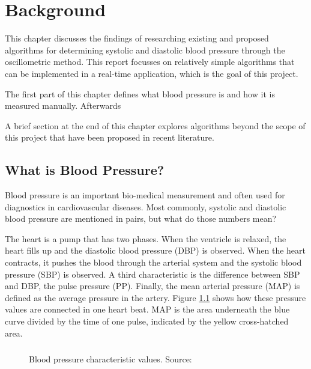 \chapter{Background}\label{cp:theory} %
This chapter discusses the findings of researching existing and proposed algorithms for determining systolic and diastolic blood pressure through the oscillometric method. This report focusses on relatively simple algorithms that can be implemented in a real-time application, which is the goal of this project.

The first part of this chapter defines what blood pressure is and how it is measured manually. Afterwards

A brief section at the end of this chapter explores algorithms beyond the scope of this project that have been proposed in recent literature.

\section{What is Blood Pressure?}
Blood pressure is an important bio-medical measurement and often used for  diagnostics in cardiovascular diseases. Most commonly, systolic and diastolic blood pressure are mentioned in pairs, but what do those numbers mean?

The heart is a pump that has two phases. When the ventricle is relaxed, the heart fills up and the diastolic blood pressure (DBP) is observed. When the heart contracts, it pushes the blood through the arterial system and the systolic blood pressure (SBP) is observed. A third characteristic is the difference between SBP and DBP, the pulse pressure (PP). Finally, the mean arterial pressure (MAP) is defined as the average pressure in the artery. Figure \ref{fig:BP} shows how these pressure values are connected in one heart beat. MAP is the area underneath the blue curve divided by the time of one pulse, indicated by the yellow cross-hatched area. \cite{Boron2012}\paragraph{}

\begin{figure}[]
\centering
\caption{Blood pressure characteristic values. Source: \cite{Boron2012}}
\label{fig:BP}
\end{figure}


